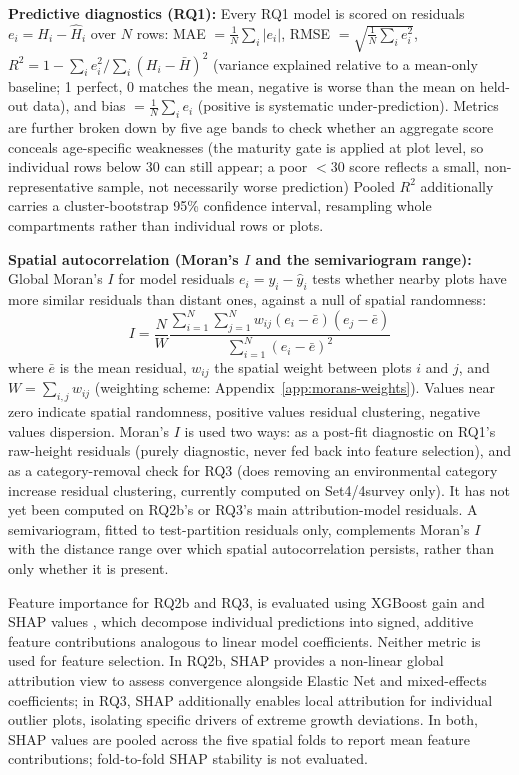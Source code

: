 \textbf{Predictive diagnostics (RQ1): }
Every RQ1 model is scored on residuals $e_i = H_i - \hat H_i$ over $N$ rows: MAE $=\frac{1}{N}\sum_i|e_i|$, RMSE $=\sqrt{\frac{1}{N}\sum_i e_i^2}$, $R^2 = 1-\sum_i e_i^2/\sum_i(H_i-\bar H)^2$ (variance explained relative to a mean-only baseline; 1 perfect, 0 matches the mean, negative is worse than the mean on held-out data), and bias $=\frac{1}{N}\sum_i e_i$ (positive is systematic under-prediction). Metrics are further broken down by five age bands to check whether an aggregate score conceals age-specific weaknesses (the maturity gate is applied at plot level, so individual rows below 30 can still appear; a poor $<30$ score reflects a small, non-representative sample, not necessarily worse prediction) %
Pooled $R^2$ additionally carries a cluster-bootstrap 95\% confidence interval, resampling whole compartments rather than individual rows or plots.

\textbf{Spatial autocorrelation (Moran's $I$ and the semivariogram range):}
Global Moran's $I$ for model residuals $e_i = y_i - \hat y_i$ tests whether nearby plots have more similar residuals than distant ones, against a null of spatial randomness:
\begin{equation}
    I = \frac{N}{W} \frac{\sum_{i=1}^{N} \sum_{j=1}^{N} w_{ij} (e_i - \bar{e})(e_j - \bar{e})}{\sum_{i=1}^{N} (e_i - \bar{e})^2}
    \label{eq:morans_i}
\end{equation}
where $\bar e$ is the mean residual, $w_{ij}$ the spatial weight between plots $i$ and $j$, and $W=\sum_{i,j} w_{ij}$ (weighting scheme: Appendix~\ref{app:morans-weights}). Values near zero indicate spatial randomness, positive values residual clustering, negative values dispersion. Moran's $I$ is used two ways: as a post-fit diagnostic on RQ1's raw-height residuals (purely diagnostic, never fed back into feature selection), and as a category-removal check for RQ3 (does removing an environmental category increase residual clustering, currently computed on Set4/4survey only). It has not yet been computed on RQ2b's or RQ3's main attribution-model residuals. %
A semivariogram, fitted to test-partition residuals only, complements Moran's $I$ with the distance range over which spatial autocorrelation persists, rather than only whether it is present.

Feature importance for RQ2b and RQ3, is evaluated using XGBoost gain and SHAP values \citep{lundberg2017unified}, which decompose individual predictions into signed, additive feature contributions analogous to linear model coefficients. Neither metric is used for feature selection. %
In RQ2b, SHAP provides a non-linear global attribution view to assess convergence alongside Elastic Net and mixed-effects coefficients; in RQ3, SHAP additionally enables local attribution for individual outlier plots, isolating specific drivers of extreme growth deviations. In both, SHAP values are pooled across the five spatial folds to report mean feature contributions; fold-to-fold SHAP stability is not evaluated.

